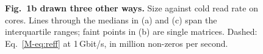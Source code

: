 \begin{figure}[tbp]
\centering
\def\fbLog{1}\def\fbPts{0}\def\fbTitle{a\quad Log axes, quartiles}\hfill
\def\fbLog{1}\def\fbPts{1}\def\fbTitle{b\quad Log axes, every matrix}

\vspace{4pt}
\def\fbLog{0}\def\fbPts{0}\def\fbTitle{c\quad Linear axes, quartiles}\hfill
\begin{minipage}[b]{0.47\linewidth}\vspace{0pt}\end{minipage}
\caption{\textbf{Fig.~1b drawn three other ways.} Size against cold read rate on  cores. Lines
through the medians in (a) and (c) span the interquartile ranges; faint points in (b) are single matrices. Dashed:
Eq.~\ref{M-eq:reff} at 1\,Gbit/s, in million non-zeros per second.}
\label{fig:sfig1b}
\end{figure}
